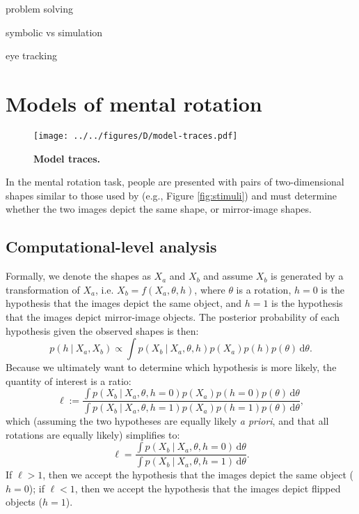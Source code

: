 \documentclass[10pt,letterpaper]{article}
\newcommand{\hi}[0]{h=0}
\newcommand{\hf}[0]{h=1}
\newcommand{\dif}[0]{\,\mathrm{d}}
\begin{document}
problem solving \cite{Hegarty2004, Schwartz1999}

symbolic vs simulation \cite{Schwartz:1996uy}

eye tracking \cite{Just1976}

\section{Models of mental rotation}

\begin{figure*}[t]
  \begin{center}
    \texttt{[image: ../../figures/D/model-traces.pdf]}
    \caption{\textbf{Model traces.}}
    \label{fig:model-traces}
  \end{center}
\end{figure*}

In the mental rotation task, people are presented with pairs of
two-dimensional shapes similar to those used by \cite{Cooper:1975wp}
(e.g., Figure \ref{fig:stimuli}) and must determine whether the two
images depict the same shape, or mirror-image shapes.

\subsection{Computational-level analysis}

Formally, we denote the shapes as $X_a$ and $X_b$ and assume $X_b$ is
generated by a transformation of $X_a$, i.e. $X_b=f(X_a, \theta, h)$,
where $\theta$ is a rotation, $h=0$ is the hypothesis that the images
depict the same object, and $h=1$ is the hypothesis that the images
depict mirror-image objects. The posterior probability of each
hypothesis given the observed shapes is then:
\begin{equation}
  p(h\ \vert\ X_a, X_b) \propto \int p(X_b\ \vert\ X_a, \theta, h)p(X_a)p(h)p(\theta)\dif\theta.
  \label{eq:posterior}
\end{equation}
Because we ultimately want to determine which hypothesis is more
likely, the quantity of interest is a ratio:
\begin{equation*}
  \ell := \frac{\int p(X_b\ \vert\ X_a, \theta, \hi)p(X_a)p(\hi)p(\theta)\dif\theta}{\int p(X_b\ \vert\ X_a, \theta, \hf)p(X_a)p(\hf)p(\theta)\dif\theta},
\end{equation*}
which (assuming the two hypotheses are equally likely \textit{a
  priori}, and that all rotations are equally likely) simplifies to:
\begin{equation}
  \ell = \frac{\int p(X_b\ \vert\ X_a, \theta, \hi)\dif\theta}{\int p(X_b\ \vert\ X_a, \theta, \hf)\dif\theta}.
  \label{eq:lh-ratio}
\end{equation}
If $\ell > 1$, then we accept the hypothesis that the images depict
the same object ($\hi$); if $\ell < 1$, then we accept the hypothesis
that the images depict flipped objects ($\hf$).
\end{document}
